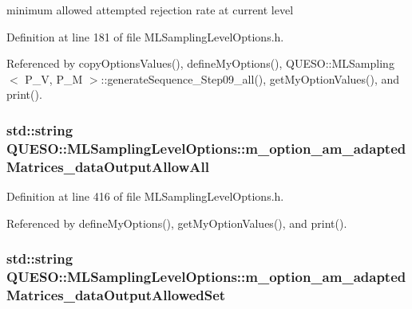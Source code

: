 minimum allowed attempted rejection rate at current level 



Definition at line 181 of file M\-L\-Sampling\-Level\-Options.\-h.



Referenced by copy\-Options\-Values(), define\-My\-Options(), Q\-U\-E\-S\-O\-::\-M\-L\-Sampling$<$ P\-\_\-\-V, P\-\_\-\-M $>$\-::generate\-Sequence\-\_\-\-Step09\-\_\-all(), get\-My\-Option\-Values(), and print().

\hypertarget{class_q_u_e_s_o_1_1_m_l_sampling_level_options_a455507e07fb1494b26f4b387a72ca7b3}{
\subsubsection[{m\-\_\-option\-\_\-am\-\_\-adapted\-Matrices\-\_\-data\-Output\-Allow\-All}]{\setlength{\rightskip}{0pt plus 5cm}std\-::string Q\-U\-E\-S\-O\-::\-M\-L\-Sampling\-Level\-Options\-::m\-\_\-option\-\_\-am\-\_\-adapted\-Matrices\-\_\-data\-Output\-Allow\-All\hspace{0.3cm}{\ttfamily [private]}}}\label{class_q_u_e_s_o_1_1_m_l_sampling_level_options_a455507e07fb1494b26f4b387a72ca7b3}


Definition at line 416 of file M\-L\-Sampling\-Level\-Options.\-h.



Referenced by define\-My\-Options(), get\-My\-Option\-Values(), and print().

\hypertarget{class_q_u_e_s_o_1_1_m_l_sampling_level_options_a28e11986f1c955a367517086890f42bc}{
\subsubsection[{m\-\_\-option\-\_\-am\-\_\-adapted\-Matrices\-\_\-data\-Output\-Allowed\-Set}]{\setlength{\rightskip}{0pt plus 5cm}std\-::string Q\-U\-E\-S\-O\-::\-M\-L\-Sampling\-Level\-Options\-::m\-\_\-option\-\_\-am\-\_\-adapted\-Matrices\-\_\-data\-Output\-Allowed\-Set\hspace{0.3cm}{\ttfamily [private]}}}\label{class_q_u_e_s_o_1_1_m_l_sampling_level_options_a28e11986f1c955a367517086890f42bc}


